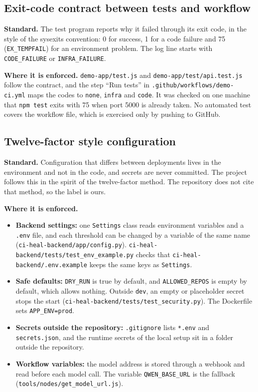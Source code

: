 \subsection{Exit-code contract between tests and workflow}

\textbf{Standard.} The test program reports why it failed through its exit code, in the style of the sysexits convention: 0 for success, 1 for a code failure and 75 (\texttt{EX\_TEMPFAIL}) for an environment problem. The log line starts with \texttt{CODE\_FAILURE} or \texttt{INFRA\_FAILURE}.

\textbf{Where it is enforced.} \texttt{demo-app/\allowbreak{}test.js} and \texttt{demo-app/\allowbreak{}test/\allowbreak{}api.test.js} follow the contract, and the step ``Run tests'' in \texttt{.github/\allowbreak{}workflows/\allowbreak{}demo-ci.yml} maps the codes to \texttt{none}, \texttt{infra} and \texttt{code}. It was checked on one machine that \texttt{npm test} exits with 75 when port 5000 is already taken. No automated test covers the workflow file, which is exercised only by pushing to GitHub.

\subsection{Twelve-factor style configuration}

\textbf{Standard.} Configuration that differs between deployments lives in the environment and not in the code, and secrets are never committed. The project follows this in the spirit of the twelve-factor method. The repository does not cite that method, so the label is ours.

\textbf{Where it is enforced.}
\begin{itemize}
  \item \textbf{Backend settings:} one \texttt{Settings} class reads environment variables and a \texttt{.env} file, and each threshold can be changed by a variable of the same name (\texttt{ci-heal-backend/\allowbreak{}app/\allowbreak{}config.py}). \texttt{ci-heal-backend/\allowbreak{}tests/\allowbreak{}test\_\allowbreak{}env\_\allowbreak{}example.py} checks that \texttt{ci-heal-backend/\allowbreak{}.env.example} keeps the same keys as \texttt{Settings}.
  \item \textbf{Safe defaults:} \texttt{DRY\_RUN} is true by default, and \texttt{ALLOWED\_REPOS} is empty by default, which allows nothing. Outside \texttt{dev}, an empty or placeholder secret stops the start (\texttt{ci-heal-backend/\allowbreak{}tests/\allowbreak{}test\_\allowbreak{}security.py}). The Dockerfile sets \texttt{APP\_ENV=prod}.
  \item \textbf{Secrets outside the repository:} \texttt{.gitignore} lists \texttt{*.env} and \texttt{secrets.json}, and the runtime secrets of the local setup sit in a folder outside the repository.
  \item \textbf{Workflow variables:} the model address is stored through a webhook and read before each model call. The variable \texttt{QWEN\_BASE\_URL} is the fallback (\texttt{tools/\allowbreak{}nodes/\allowbreak{}get\_\allowbreak{}model\_\allowbreak{}url.js}).
\end{itemize}

